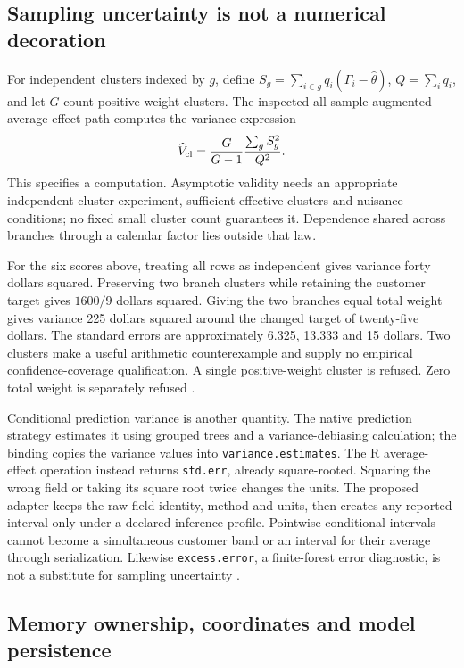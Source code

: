 \subsection{Sampling uncertainty is not a numerical decoration}

For independent clusters indexed by \(g\), define
\(S_g=\sum_{i\in g}q_i(\Gamma_i-\widehat\theta)\), \(Q=\sum_iq_i\), and
let \(G\) count positive-weight clusters. The inspected all-sample
augmented average-effect path computes the variance expression \[
 \widehat V_{\rm cl}=\frac{G}{G-1}\frac{\sum_g S_g^2}{Q^2}.
\] This specifies a computation. Asymptotic validity needs an
appropriate independent-cluster experiment, sufficient effective
clusters and nuisance conditions; no fixed small cluster count
guarantees it. Dependence shared across branches through a calendar
factor lies outside that law.

For the six scores above, treating all rows as independent gives
variance forty dollars squared. Preserving two branch clusters while
retaining the customer target gives \(1600/9\) dollars squared. Giving
the two branches equal total weight gives variance 225 dollars squared
around the changed target of twenty-five dollars. The standard errors
are approximately 6.325, 13.333 and 15 dollars. Two clusters make a
useful arithmetic counterexample and supply no empirical
confidence-coverage qualification. A single positive-weight cluster is
refused. Zero total weight is separately refused
\citep{exec13_grf_oracle,exec13_grf_rpath}.

Conditional prediction variance is another quantity. The native
prediction strategy estimates it using grouped trees and a
variance-debiasing calculation; the binding copies the variance values
into \texttt{variance.estimates}. The R average-effect operation instead
returns \texttt{std.err}, already square-rooted. Squaring the wrong
field or taking its square root twice changes the units. The proposed
adapter keeps the raw field identity, method and units, then creates any
reported interval only under a declared inference profile. Pointwise
conditional intervals cannot become a simultaneous customer band or an
interval for their average through serialization. Likewise
\texttt{excess.error}, a finite-forest error diagnostic, is not a
substitute for sampling uncertainty
\citep{exec13_grf_native,exec13_grf_rpath}.

\subsection{Memory ownership, coordinates and model persistence}

